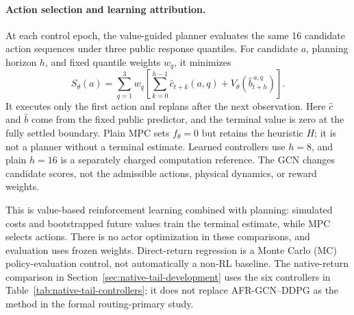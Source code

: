 \documentclass[preprint,review,12pt]{elsarticle}
\begin{document}
\paragraph{Action selection and learning attribution.}
At each control epoch, the value-guided planner evaluates the same 16 candidate
action sequences under three public response quantiles. For candidate $a$,
planning horizon $h$, and fixed quantile weights $w_q$, it minimizes
\begin{equation}
 S_\theta(a)=\sum_{q=1}^{3}w_q\left[
   \sum_{k=0}^{h-1}\widehat c_{t+k}(a,q)
   +V_\theta(\widehat b_{t+h}^{\,a,q})\right].
\label{eq:value-mpc-score}
\end{equation}
It executes only the first action and replans after the next observation.
Here $\widehat c$ and $\widehat b$ come from the fixed public predictor, and
the terminal value is zero at the fully settled boundary. Plain MPC sets
$f_\theta=0$ but retains the heuristic $H$; it is not a planner without a
terminal estimate. Learned controllers use $h=8$, and plain $h=16$ is a
separately charged computation reference. The GCN changes candidate scores,
not the admissible actions, physical dynamics, or reward weights.

This is value-based reinforcement learning combined with planning: simulated
costs and bootstrapped future values train the terminal estimate, while MPC
selects actions. There is no actor optimization in these comparisons, and
evaluation uses frozen weights. Direct-return regression is a Monte Carlo
(MC) policy-evaluation control, not automatically a non-RL baseline. The
native-return comparison in Section~\ref{sec:native-tail-development} uses
the six controllers in Table~\ref{tab:native-tail-controllers}; it does not
replace AFR-GCN--DDPG as the method in the formal routing-primary study.
\end{document}
